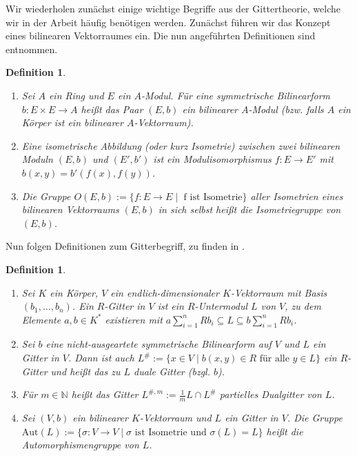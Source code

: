 \documentclass[12pt,a4paper,halfparskip,headsepline,bibtotocnumbered]{scrreprt}
\theoremstyle{nummermitklammern}
\newtheorem{definition}[defsatzusw]{Definition}
\theoremstyle{nonumberbreak}
\newcommand{\N}{\mathbb{N}}
\newcommand{\Aut}{\text{Aut}}
\begin{document}
Wir wiederholen zunächst einige wichtige Begriffe aus der Gittertheorie, welche wir in der Arbeit häufig benötigen werden. Zunächst führen wir das Konzept eines bilinearen Vektorraumes ein. Die nun angeführten Definitionen sind \cite[Def. (2.1)]{kneser} entnommen.

\begin{framed}
	\begin{definition}
		\begin{enumerate}[label=(\roman*)]
			\item Sei $A$ ein Ring und $E$ ein $A$-Modul. Für eine symmetrische Bilinearform\linebreak
				$b : E \times E \rightarrow A$ heißt das Paar $(E,b)$ ein \textit{bilinearer $A$-Modul} (bzw. falls $A$ ein Körper ist ein \textit{bilinearer $A$-Vektorraum}).
			\item Eine \textit{isometrische Abbildung} (oder kurz \textit{Isometrie}) zwischen zwei bilinearen Moduln $(E,b)$ und $(E', b')$ ist ein Modulisomorphismus $f : E \rightarrow E'$ mit $b(x,y) = b'(f(x), f(y))$.
			\item Die Gruppe $O(E,b) := \lbrace f : E \rightarrow E \mid \text{ f ist Isometrie}\rbrace$ aller Isometrien eines bilinearen Vektorraums $(E,b)$ in sich selbst heißt die \textit{Isometriegruppe} von $(E,b)$.
		\end{enumerate}
	\end{definition}
\end{framed}

Nun folgen Definitionen zum Gitterbegriff, zu finden in \cite[Def. (14.1), (14.2)]{kneser}.

\begin{framed}
	\begin{definition}
		\begin{enumerate}[label=(\roman*)]
			\item Sei $K$ ein Körper, $V$ ein endlich-dimensionaler $K$-Vektorraum mit Basis $(b_1,\dots,b_n)$. Ein $R$-Gitter in $V$ ist ein $R$-Untermodul $L$ von $V$, zu dem Elemente $a,b \in K^*$ existieren mit $a \sum_{i=1}^n R b_i \subseteq L \subseteq b \sum_{i=1}^n R b_i$.
			\item Sei $b$ eine nicht-ausgeartete symmetrische Bilinearform auf $V$ und $L$ ein Gitter in $V$. Dann ist auch $L^\# := \lbrace x \in V \mid b(x,y) \in R \text{ für alle } y \in L \rbrace$ ein $R$-Gitter und heißt \textit{das zu $L$ duale Gitter} (bzgl. $b$).
			\item Für $m \in \N$ heißt das Gitter $L^{\#,m} := \frac{1}{m}L \cap L^\#$ \textit{partielles Dualgitter} von $L$.
			\item Sei $(V,b)$ ein bilinearer $K$-Vektorraum und $L$ ein Gitter in $V$. Die Gruppe $\Aut(L) := \lbrace \sigma : V \rightarrow V \mid \sigma \text{ ist Isometrie und } \sigma(L) = L \rbrace$ heißt die \textit{Automorphismengruppe} von $L$.
		\end{enumerate}
	\end{definition}
\end{framed}
\end{document}

